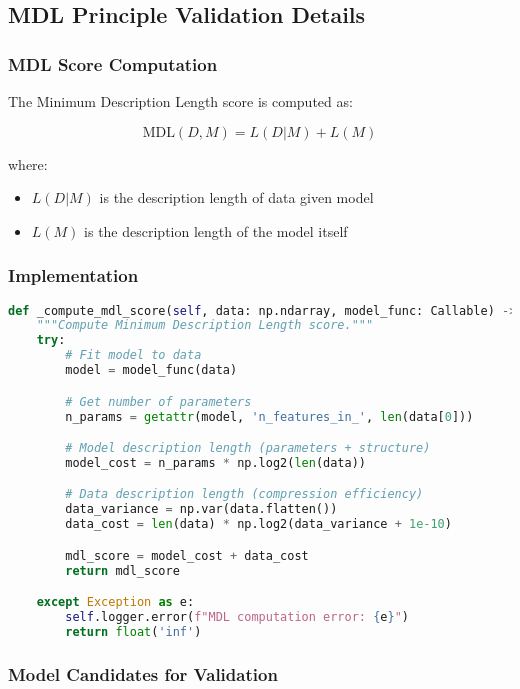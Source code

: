 \subsection{MDL Principle Validation Details}

\subsubsection{MDL Score Computation}

The Minimum Description Length score is computed as:

\begin{equation}
\text{MDL}(D, M) = L(D|M) + L(M)
\end{equation}

where:
\begin{itemize}
    \item $L(D|M)$ is the description length of data given model
    \item $L(M)$ is the description length of the model itself
\end{itemize}

\subsubsection{Implementation}

\begin{lstlisting}[language=Python, caption=MDL score computation]
def _compute_mdl_score(self, data: np.ndarray, model_func: Callable) -> float:
    """Compute Minimum Description Length score."""
    try:
        # Fit model to data
        model = model_func(data)

        # Get number of parameters
        n_params = getattr(model, 'n_features_in_', len(data[0]))

        # Model description length (parameters + structure)
        model_cost = n_params * np.log2(len(data))

        # Data description length (compression efficiency)
        data_variance = np.var(data.flatten())
        data_cost = len(data) * np.log2(data_variance + 1e-10)

        mdl_score = model_cost + data_cost
        return mdl_score

    except Exception as e:
        self.logger.error(f"MDL computation error: {e}")
        return float('inf')
\end{lstlisting}

\subsubsection{Model Candidates for Validation}


